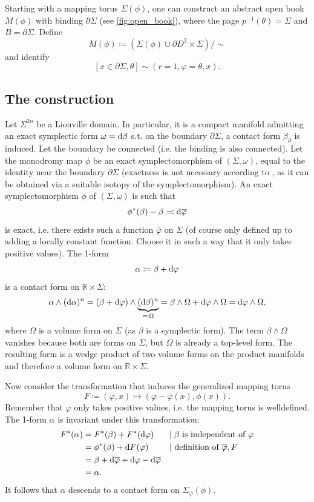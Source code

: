 Starting with a mapping torus $\Sigma(\phi)$, one can construct an abstract open book $M(\phi)$ with binding $\partial \Sigma$ (see \cref{fig:open_book}),
where the page $p^{-1}(\theta) = \Sigma$ and $B = \partial \Sigma$.
Define
\[
    M(\phi) \coloneqq \left(\Sigma(\phi) \cup \partial D^2 \times \Sigma\right)/\sim
\]
and identify
\[
    [x \in \partial \Sigma, \theta] \sim (r=1, \varphi = \theta, x).
\]


\subsection*{The construction}

Let $\Sigma^{2n}$ be a Liouville domain. 
In particular, it is a compact manifold admitting an exact symplectic form $\omega = \mathrm{d} \beta$ 
s.t. on the boundary $\partial \Sigma$, a contact form $\beta_\partial$ is induced.
Let the boundary be connected (i.e. the binding is also connected).
Let the monodromy map $\phi$ be an exact symplectomorphism of $(\Sigma, \omega)$,
equal to the identity near the boundary $\partial \Sigma$ 
(exactness is not necessary according to \cite{Geiges08}, as it can be obtained via a suitable isotopy of the symplectomorphism).
An exact symplectomorphism $\phi$ of $(\Sigma, \omega)$ is such that
\[
    \phi^*(\beta) - \beta \eqqcolon \mathrm{d} \overline{\varphi}  
\]
is exact, i.e. there exists such a function $\overline{\varphi}$ on $\Sigma$ (of course only defined up to adding a locally constant function. Choose it in such a way that it only takes positive values).
The 1-form 
\[
    \alpha \coloneqq \beta + \mathrm{d} \varphi
\]
is a contact form on $\mathbb R \times \Sigma$:
\[
    \alpha \wedge (\mathrm{d} \alpha)^{n} = (\beta + \mathrm{d} \varphi)\wedge \underbrace{(\mathrm{d} \beta)^n}_{\eqqcolon \Omega} = \beta \wedge \Omega + \mathrm{d} \varphi \wedge \Omega = \mathrm{d} \varphi \wedge \Omega,
\]
where $\Omega$ is a volume form on $\Sigma$ (as $\beta$ is a symplectic form).
The term $\beta \wedge \Omega$ vanishes because both are forms on $\Sigma$, but $\Omega$ is already a top-level form.
The resulting form is a wedge product of two volume forms on the product manifolds and therefore a volume form on $\mathbb R \times \Sigma$.

Now consider the transformation that induces the generalized mapping torus
\[
    F \coloneqq (\varphi, x) \mapsto (\varphi - \overline{\varphi}(x), \phi(x)).    
\]
Remember that $\varphi$ only takes positive values, i.e. the mapping torus is welldefined.
The 1-form $\alpha$ is invariant under this transformation:
\begin{align*}
    F^*(\alpha) &= F^*(\beta) + F^*(\mathrm{d} \varphi)&&|\;\beta\text{ is independent of }\varphi\\
    &= \phi^*(\beta) + \mathrm{d} F(\varphi)&&|\text{ definition of }\overline{\varphi}, F\\
    &= \beta + \mathrm{d}\overline{\varphi} + \mathrm{d} \varphi - \mathrm{d} \overline{\varphi}\\
    &= \alpha.
\end{align*}
It follows that $\alpha$ descends to a contact form on $\Sigma_{\overline{\varphi}}(\phi)$. 


